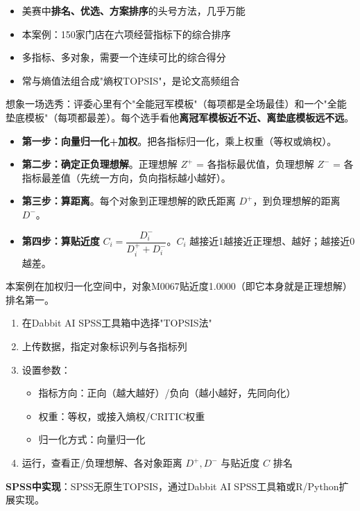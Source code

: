 \begin{algoscene}
\begin{itemize}
    \item 美赛中\textbf{排名、优选、方案排序}的头号方法，几乎万能
    \item 本案例：150家门店在六项经营指标下的综合排序
    \item 多指标、多对象，需要一个连续可比的综合得分
    \item 常与熵值法组合成"熵权TOPSIS"，是论文高频组合
\end{itemize}
\end{algoscene}

\begin{algoprinciple}
想象一场选秀：评委心里有个"全能冠军模板"（每项都是全场最佳）和一个"全能垫底模板"（每项都最差）。每个选手看他\textbf{离冠军模板近不近、离垫底模板远不远}。

\begin{itemize}
    \item \textbf{第一步：向量归一化+加权}。把各指标归一化，乘上权重（等权或熵权）。
    \item \textbf{第二步：确定正负理想解}。正理想解 $Z^+$ = 各指标最优值，负理想解 $Z^-$ = 各指标最差值（先统一方向，负向指标越小越好）。
    \item \textbf{第三步：算距离}。每个对象到正理想解的欧氏距离 $D^+$，到负理想解的距离 $D^-$。
    \item \textbf{第四步：算贴近度} $C_i=\dfrac{D_i^-}{D_i^+ + D_i^-}$。$C_i$ 越接近1越接近正理想、越好；越接近0越差。
\end{itemize}

本案例在加权归一化空间中，对象M0067贴近度1.0000（即它本身就是正理想解）排名第一。
\end{algoprinciple}

\begin{algosposs}
\begin{enumerate}
    \item 在Dabbit AI SPSS工具箱中选择"TOPSIS法"
    \item 上传数据，指定对象标识列与各指标列
    \item 设置参数：
    \begin{itemize}
        \item 指标方向：正向（越大越好）/负向（越小越好，先同向化）
        \item 权重：等权，或接入熵权/CRITIC权重
        \item 归一化方式：向量归一化
    \end{itemize}
    \item 运行，查看正/负理想解、各对象距离 $D^+,D^-$ 与贴近度 $C$ 排名
\end{enumerate}

\textbf{SPSS中实现}：SPSS无原生TOPSIS，通过Dabbit AI SPSS工具箱或R/Python扩展实现。
\end{algosposs}

